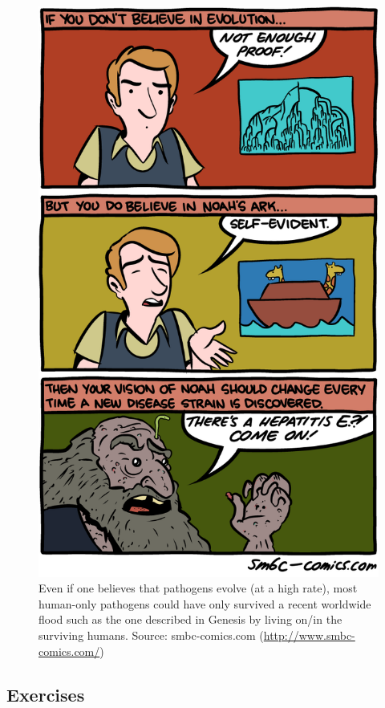 \documentclass[]{article}
\theoremstyle{definition}
\theoremstyle{definition}
\theoremstyle{definition}
\theoremstyle{remark}
\begin{document}
\begin{figure}
\centering
\includegraphics{./images/smbc-ID-evolution.png}
\caption{Even if one believes that pathogens evolve (at a high rate),
most human-only pathogens could have only survived a recent worldwide
flood such as the one described in Genesis by living on/in the surviving
humans. Source: smbc-comics.com (\url{http://www.smbc-comics.com/})}
\end{figure}

\subsection{Exercises}\label{exercises-12}
\end{document}

